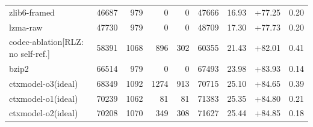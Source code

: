 \begin{table}[h]
\begin{tabular}{lrrrrrrrr}
zlib6-framed & 46687 & 979 & 0 & 0 & 47666 & 16.93 & +77.25 & 0.20 \\
lzma-raw & 47730 & 979 & 0 & 0 & 48709 & 17.30 & +77.73 & 0.20 \\
codec-ablation[RLZ: no self-ref.] & 58391 & 1068 & 896 & 302 & 60355 & 21.43 & +82.01 & 0.41 \\
bzip2 & 66514 & 979 & 0 & 0 & 67493 & 23.98 & +83.93 & 0.14 \\
ctxmodel-o3(ideal) & 68349 & 1092 & 1274 & 913 & 70715 & 25.10 & +84.65 & 0.39 \\
ctxmodel-o1(ideal) & 70239 & 1062 & 81 & 81 & 71383 & 25.35 & +84.80 & 0.21 \\
ctxmodel-o2(ideal) & 70208 & 1070 & 349 & 308 & 71627 & 25.44 & +84.85 & 0.18 \\
\bottomrule\end{tabular}\end{table}
